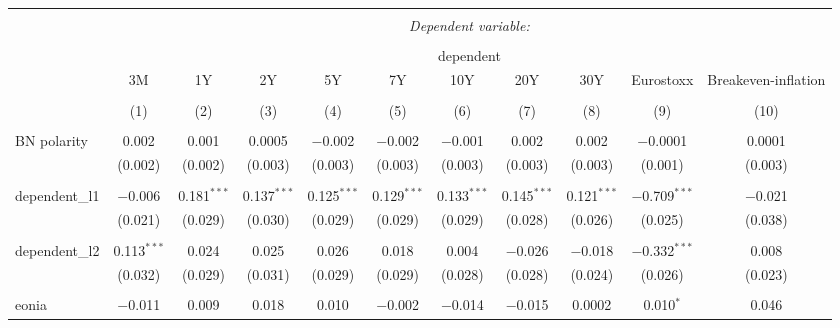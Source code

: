 

\begin{table}[!htbp] \centering 
  \caption{} 
  \label{} 
  \begin{adjustbox}{width=1.35\textwidth}
\begin{tabular}{@{\extracolsep{5pt}}lcccccccccc} 
\\[-1.8ex]\hline 
\hline \\[-1.8ex] 
 & \multicolumn{10}{c}{\textit{Dependent variable:}} \\ 
\cline{2-11} 
\\[-1.8ex] & \multicolumn{10}{c}{dependent} \\ 
 & 3M & 1Y & 2Y & 5Y & 7Y & 10Y & 20Y & 30Y & Eurostoxx & Breakeven-inflation \\ 
\\[-1.8ex] & (1) & (2) & (3) & (4) & (5) & (6) & (7) & (8) & (9) & (10)\\ 
\hline \\[-1.8ex] 
 BN polarity & 0.002 & 0.001 & 0.0005 & $-$0.002 & $-$0.002 & $-$0.001 & 0.002 & 0.002 & $-$0.0001 & 0.0001 \\ 
  & (0.002) & (0.002) & (0.003) & (0.003) & (0.003) & (0.003) & (0.003) & (0.003) & (0.001) & (0.003) \\ 
  & & & & & & & & & & \\ 
 dependent\_l1 & $-$0.006 & 0.181$^{***}$ & 0.137$^{***}$ & 0.125$^{***}$ & 0.129$^{***}$ & 0.133$^{***}$ & 0.145$^{***}$ & 0.121$^{***}$ & $-$0.709$^{***}$ & $-$0.021 \\ 
  & (0.021) & (0.029) & (0.030) & (0.029) & (0.029) & (0.029) & (0.028) & (0.026) & (0.025) & (0.038) \\ 
  & & & & & & & & & & \\ 
 dependent\_l2 & 0.113$^{***}$ & 0.024 & 0.025 & 0.026 & 0.018 & 0.004 & $-$0.026 & $-$0.018 & $-$0.332$^{***}$ & 0.008 \\ 
  & (0.032) & (0.029) & (0.031) & (0.029) & (0.029) & (0.028) & (0.028) & (0.024) & (0.026) & (0.023) \\ 
  & & & & & & & & & & \\ 
 eonia & $-$0.011 & 0.009 & 0.018 & 0.010 & $-$0.002 & $-$0.014 & $-$0.015 & 0.0002 & 0.010$^{*}$ & 0.046 \\ 

\end{tabular}
\end{adjustbox}
\end{table}
